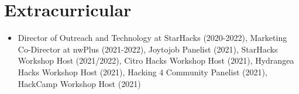 \documentclass[a4paper,11pt]{article}
\newcommand{\resumeItem}[1]{
	\item\small{
		{#1 \vspace{-2pt}}
	}
}
\newcommand{\resumeItemListStart}{\begin{itemize}\OpenSansRegular}
\newcommand{\resumeItemListEnd}{\end{itemize}\vspace{-5pt}}
\begin{document}



\section{Extracurricular}
\resumeItemListStart
\resumeItem{
	Director of Outreach and Technology at StarHacks {\OpenSansItalic(2020-2022)},
	Marketing Co-Director at nwPlus {\OpenSansItalic(2021-2022)},
	Joytojob Panelist {\OpenSansItalic(2021)},
	StarHacks Workshop Host {\OpenSansItalic(2021/2022)},
	Citro Hacks Workshop Host {\OpenSansItalic(2021)},
	Hydrangea Hacks Workshop Host {\OpenSansItalic(2021)},
	Hacking 4 Community Panelist {\OpenSansItalic(2021)},
	HackCamp Workshop Host {\OpenSansItalic(2021)}
}
\resumeItemListEnd

\end{document}
